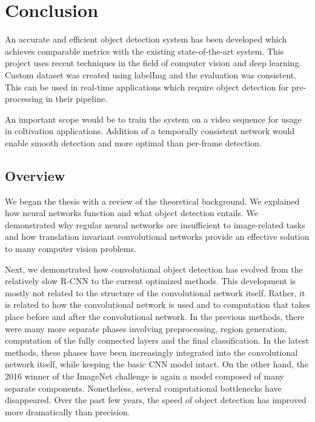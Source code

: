 \section{Conclusion}
An accurate and efficient object detection system has been developed which achieves comparable metrics with the existing state-of-the-art system. This project uses recent techniques in the field of computer vision and deep learning. Custom dataset was created using labelImg and the evaluation was consistent. This can be used in real-time applications which require object detection for pre-processing in their pipeline.

An important scope would be to train the system on a video sequence for usage in coltivation applications. Addition of a temporally consistent network would enable smooth detection and more optimal than per-frame detection.

\subsection{Overview}

We began the thesis with a review of the theoretical background. We explained how neural networks function and what object detection entails. We demonstrated why regular neural networks are insufficient to image-related tasks and how translation invariant convolutional networks provide an effective solution to many computer vision problems. 

Next, we demonstrated how convolutional object detection has evolved from the relatively slow R-CNN to the current optimized methods. This development is mostly not related to the structure of the convolutional network itself. Rather, it is related to how the convolutional network is used and to computation that takes place before and after the convolutional network. In the previous methods, there were many more separate phases involving preprocessing, region generation, computation of the fully connected layers and the final classification. In the latest methods, these phases have been increasingly integrated into the convolutional network itself, while keeping the basic CNN model intact. On the other hand, the 2016 winner of the ImageNet challenge is again a model composed of many separate components. Nonetheless, several computational bottlenecks have disappeared. Over the past few years, the speed of object detection has improved more dramatically than precision.

